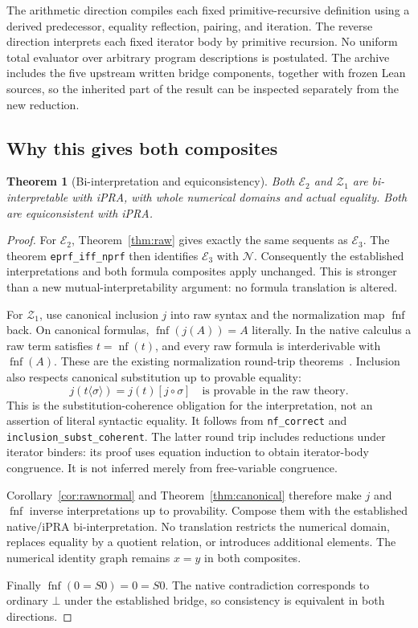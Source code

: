\documentclass[11pt]{article}
\newtheorem{theorem}{Theorem}[section]
\theoremstyle{definition}\newtheorem{definition}[theorem]{Definition}
\newcommand{\Ethree}{\mathcal E_3}
\newcommand{\Rtwo}{\mathcal E_2}
\newcommand{\Zone}{\mathcal Z_1}
\newcommand{\N}{\mathcal N}
\newcommand{\nf}{\operatorname{nf}}
\newcommand{\fnf}{\operatorname{fnf}}
\begin{document}
The arithmetic direction compiles each fixed primitive-recursive
definition using a derived predecessor, equality reflection, pairing,
and iteration. The reverse direction interprets each fixed iterator
body by primitive recursion. No uniform total evaluator over arbitrary
program descriptions is postulated. The archive includes the five
upstream written bridge components, together with frozen Lean sources,
so the inherited part of the result can be inspected separately from
the new reduction.

\subsection{Why this gives both composites}

\begin{theorem}[Bi-interpretation and equiconsistency]
Both $\Rtwo$ and $\Zone$ are bi-interpretable with iPRA, with whole
numerical domains and actual equality. Both are equiconsistent with iPRA.
\end{theorem}
\begin{proof}
For $\Rtwo$, Theorem~\ref{thm:raw} gives exactly the same sequents
as $\Ethree$. The theorem \texttt{eprf\_iff\_nprf} then identifies
$\Ethree$ with $\N$. Consequently the established interpretations and
both formula composites apply unchanged. This is stronger than a new
mutual-interpretability argument: no formula translation is altered.

For $\Zone$, use canonical inclusion $j$ into raw syntax and the
normalization map $\fnf$ back. On canonical formulas,
$\fnf(j(A))=A$ literally. In the native calculus a raw term satisfies
$t=\nf(t)$, and every raw formula is interderivable with $\fnf(A)$.
These are the existing normalization round-trip theorems~\cite{normal}.
Inclusion also respects canonical substitution up to provable equality:
\[
 j(t\langle\sigma\rangle)=j(t)[j\circ\sigma]
 \quad\text{is provable in the raw theory}.
\]
This is the substitution-coherence obligation for the interpretation,
not an assertion of literal syntactic equality. It follows from
\texttt{nf\_correct} and \texttt{inclusion\_subst\_coherent}.
The latter round trip includes reductions under iterator binders: its
proof uses equation induction to obtain iterator-body congruence. It is
not inferred merely from free-variable congruence.

Corollary~\ref{cor:rawnormal} and Theorem~\ref{thm:canonical} therefore
make $j$ and $\fnf$ inverse interpretations up to provability. Compose
them with the established native/iPRA bi-interpretation. No translation
restricts the numerical domain, replaces equality by a quotient
relation, or introduces additional elements. The numerical identity
graph remains $x=y$ in both composites.

Finally $\fnf(0=S0)=0=S0$. The native contradiction corresponds to
ordinary $\bot$ under the established bridge, so consistency is
equivalent in both directions.
\end{proof}
\end{document}

